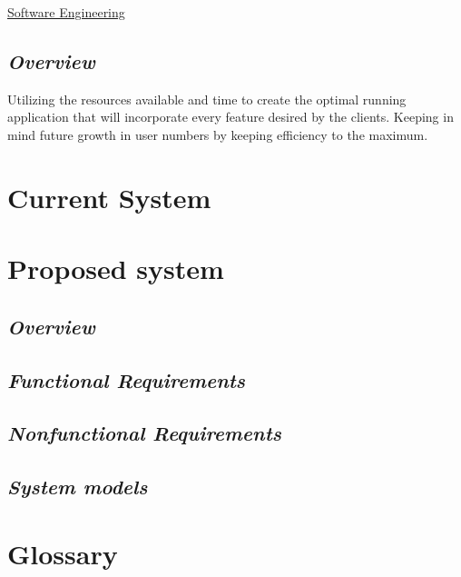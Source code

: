 \documentclass[a4paper]{article}
\begin{document}
\href{ https://cle.wits.ac.za/access/content/group/COMS3009_2016/book-SE_marsic.pdf}{Software Engineering}
		
\subsection{\textit{Overview}}

Utilizing the resources available and time to create the optimal running application that will incorporate every feature desired by the clients. Keeping in mind future growth in user numbers by keeping efficiency to the maximum.

\newpage

\section{Current System}
	
\newpage

\section{Proposed system}

\subsection{\textit{Overview}}
		
\subsection{\textit{Functional Requirements}}
		
\subsection{\textit{Nonfunctional Requirements}}
		
\subsection{\textit{System models}}

\newpage

\section{Glossary}
\end{document}
